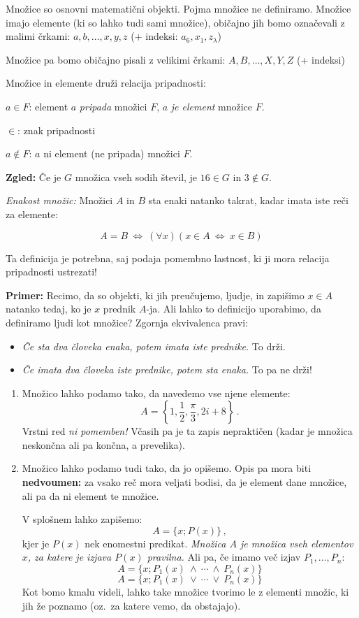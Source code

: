 \documentclass[12pt,a4paper]{article}
\def\ali {{~\vee~}}
\def\inn {{~\wedge~}}
\def\cee {{~\Leftrightarrow~}}
\begin{document}
{
\indent Množice so osnovni matematični objekti. Pojma množice ne definiramo.
Množice imajo elemente (ki so lahko tudi sami množice), običajno jih bomo označevali z malimi črkami:
$a,b,\ldots, x,y,z$ (+ indeksi: $a_6, x_1, z_\lambda$)

\smallskip

Množice pa bomo običajno pisali z velikimi črkami: $A,B,\ldots, X,Y,Z$ (+ indeksi)

\smallskip
Množice in elemente druži relacija pripadnosti:

$a\in F$: element $a$ {\it pripada} množici $F$, $a$ {\it je element} množice $F$.

\smallskip

$\in$: znak pripadnosti

\smallskip
$a\not\in F$: $a$ ni element (ne pripada) množici $F$.

\smallskip

{\bf Zgled:}
Če je $G$ množica vseh sodih števil, je $16\in G$ in $3\not\in G$.


\medskip
{\em Enakost množic:} Množici $A$ in $B$ sta enaki natanko takrat, kadar imata iste reči za elemente:

$$A = B \cee (\forall x) (x\in A\cee x\in B)$$

\medskip
Ta definicija je potrebna, saj podaja pomembno lastnost, ki ji mora relacija pripadnosti ustrezati!

{\bf Primer:} Recimo, da so objekti, ki jih preučujemo, ljudje,
in zapišimo $x\in A$ natanko tedaj, ko je $x$ prednik $A$-ja.
Ali lahko to definicijo uporabimo, da definiramo ljudi kot množice?
Zgornja ekvivalenca pravi:
\begin{itemize}
  \item {\em Če sta dva človeka enaka, potem imata iste prednike.} To drži.
  \item {\em Če imata dva človeka iste prednike, potem sta enaka.} To pa ne drži!
\end{itemize}

\begin{enumerate}
  \item Množico lahko podamo tako, da navedemo vse njene elemente:
$$A = \left\{1,\frac{1}{2}, \frac{\pi}{3}, 2i+8\right\}\,.$$
Vrstni red {\em ni pomemben!}
Včasih pa je ta zapis nepraktičen (kadar je množica neskončna ali pa končna, a prevelika).
  \item Množico lahko podamo tudi tako, da jo opišemo. Opis pa mora biti {\bf nedvoumen:}
za vsako reč mora veljati bodisi, da je element dane množice, ali pa da ni element te množice.

V splošnem lahko zapišemo:
$$A = \{x; P(x)\}\,,$$
kjer je $P(x)$ nek enomestni predikat.
{\em Množica $A$ je množica vseh elementov $x$, za katere je izjava $P(x)$ pravilna.}
Ali pa, če imamo več izjav $P_1,\ldots, P_n$:
$$A = \{x; P_1(x)\inn \cdots\inn P_n(x)\}$$
$$A = \{x; P_1(x)\ali \cdots\ali P_n(x)\}$$
Kot bomo kmalu videli, lahko take množice tvorimo le z elementi množic, ki jih že poznamo (oz.~za katere vemo, da obstajajo).
\end{enumerate}
}
\end{document}
